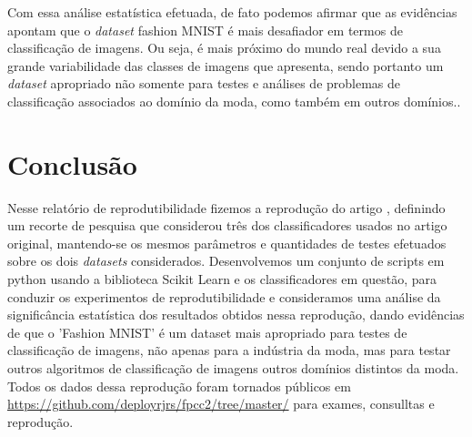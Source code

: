 \documentclass{article}
\begin{document}
Com essa análise estatística efetuada, de fato podemos afirmar que as evidências apontam que o \textit{dataset} fashion MNIST é mais desafiador em termos de classificação de imagens. Ou seja, é mais próximo do mundo real devido a sua
grande variabilidade das classes de imagens que apresenta, sendo portanto um \textit{dataset} apropriado não somente para testes e análises de problemas de classificação associados ao domínio da moda, como também em outros domínios.\cite{Olivia}.

\section{Conclusão}

Nesse relatório de reprodutibilidade fizemos a reprodução do artigo \cite{Xiao2017FashionMNISTAN}, definindo um recorte de pesquisa que considerou três dos classificadores usados no artigo original, mantendo-se os mesmos parâmetros e quantidades de testes efetuados sobre os dois \textit{datasets} considerados. Desenvolvemos um conjunto de scripts em python usando a biblioteca Scikit Learn e os classificadores em questão, para conduzir os experimentos de reprodutibilidade e consideramos uma análise da significância estatística dos resultados obtidos nessa reprodução, dando evidências de que o 'Fashion MNIST' é um dataset mais apropriado para testes de classificação de imagens, não apenas para a indústria da moda, mas para testar outros algoritmos de classificação de imagens outros domínios distintos da moda. Todos os dados dessa reprodução foram tornados públicos em \url{https://github.com/deployrjrs/fpcc2/tree/master/} para exames, consulltas e reprodução.


\end{document}
